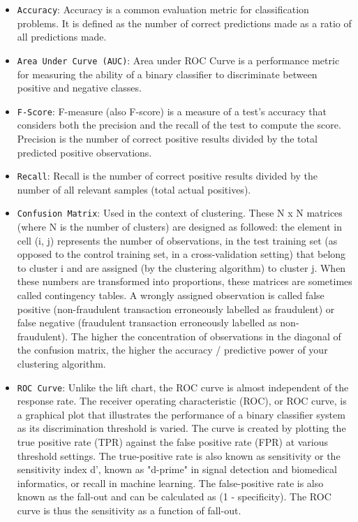 \documentclass[12pt]{article}
\begin{document}
\begin{itemize}
\item
\texttt{Accuracy}: Accuracy is a common evaluation metric for classification problems. It is defined as the number of correct predictions made as a ratio of all predictions made. 

\item
\texttt{Area Under Curve (AUC)}: Area under ROC Curve is a performance metric for measuring the ability of a binary classifier to discriminate between positive and negative classes.
\item
\texttt{F-Score}: F-measure (also F-score) is a measure of a test’s accuracy that considers both the precision and the recall of the test to compute the score. Precision is the number of correct positive results divided by the total predicted positive observations. 

\item
\texttt{Recall}: Recall is the number of correct positive results divided by the number of all relevant samples (total actual positives).
\item
\texttt{Confusion Matrix}: Used in the context of clustering. These N x N matrices (where N is the number of clusters) are designed as followed: the element in cell (i, j) represents the number of observations, in the test training set (as opposed to the control training set, in a cross-validation setting) that belong to cluster i and are assigned (by the clustering algorithm) to cluster j. When these numbers are transformed into proportions, these matrices are sometimes called contingency tables. A wrongly assigned observation is called false positive (non-fraudulent transaction erroneously labelled as fraudulent) or false negative (fraudulent transaction erroneously labelled as non- fraudulent). The higher the concentration of observations in the diagonal of the confusion matrix, the higher the accuracy / predictive power of your clustering algorithm.

\item
\texttt{ROC Curve}: Unlike the lift chart, the ROC curve is almost independent of the response rate. The receiver operating characteristic (ROC), or ROC curve, is a graphical plot that illustrates the performance of a binary classifier system as its discrimination threshold is varied. The curve is created by plotting the true positive rate (TPR) against the false positive rate (FPR) at various threshold settings. The true-positive rate is also known as sensitivity or the sensitivity index d', known as "d-prime" in signal detection and biomedical informatics, or recall in machine learning. The false-positive rate is also known as the fall-out and can be calculated as (1 - specificity). The ROC curve is thus the sensitivity as a function of fall-out.


\end{itemize}
\end{document}
